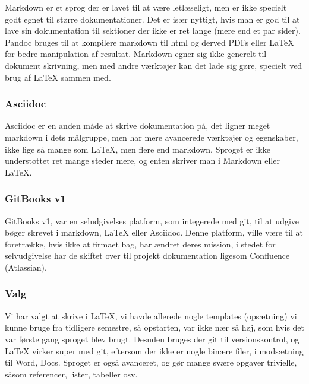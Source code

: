 Markdown er et sprog der er lavet til at være letlæseligt, men er ikke specielt godt egnet til større dokumentationer. Det er især nyttigt, hvis man er god til at lave sin dokumentation til sektioner der ikke er ret lange (mere end et par sider). Pandoc bruges til at kompilere markdown til html og derved PDFs eller LaTeX for bedre manipulation af resultat. Markdown egner sig ikke generelt til dokument skrivning, men med andre værktøjer kan det lade sig gøre, specielt ved brug af LaTeX sammen med.

\subsubsection{Asciidoc}

Asciidoc er en anden måde at skrive dokumentation på, det ligner meget markdown i dets målgruppe, men har mere avancerede værktøjer og egenskaber, ikke lige så mange som LaTeX, men flere end markdown. Sproget er ikke understøttet ret mange steder mere, og enten skriver man i Markdown eller LaTeX. 

\subsubsection{GitBooks v1}

GitBooks v1, var en seludgivelses platform, som integerede med git, til at udgive bøger skrevet i markdown, LaTeX eller Asciidoc. Denne platform, ville være til at foretrække, hvis ikke at firmaet bag, har ændret deres mission, i stedet for selvudgivelse har de skiftet over til projekt dokumentation ligesom Confluence (Atlassian).

\subsubsection{Valg}

Vi har valgt at skrive i LaTeX, vi havde allerede nogle templates (opsætning) vi kunne bruge fra tidligere semestre, så opstarten, var ikke nær så høj, som hvis det var første gang sproget blev brugt. Desuden bruges der git til versionskontrol, og LaTeX virker super med git, eftersom der ikke er nogle binære filer, i modsætning til Word, Docs. Sproget er også avanceret, og gør mange svære opgaver trivielle, såsom referencer, lister, tabeller osv.

